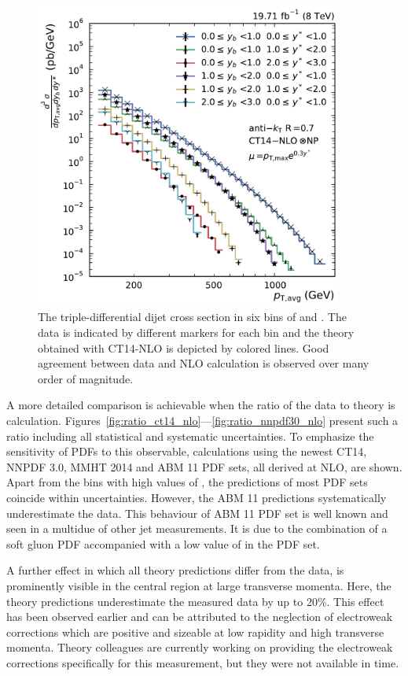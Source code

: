 \begin{figure}[h!tbp]
    \centering
    \includegraphics[width=0.9\textwidth]{figures/measurement/ptavg_spectrum.pdf}\hfill
    \caption[Spectrum of the Triple-differential Dijet Cross Section]{The
    triple-differential dijet cross section in six bins of \ystar and \yboost. The
    data is indicated by different markers for each bin and the theory obtained
    with CT14-NLO is depicted by colored lines. Good agreement between data and
    NLO calculation is observed over many order of magnitude.}
    \label{fig:measurement_result}
\end{figure}

A more detailed comparison is achievable when the ratio of the data to theory is
calculation. Figures~\ref{fig:ratio_ct14_nlo}---\ref{fig:ratio_nnpdf30_nlo}
present such a ratio including all statistical and systematic uncertainties. To
emphasize the sensitivity of PDFs to this observable, calculations using the
newest CT14, NNPDF 3.0, MMHT 2014 and ABM 11 PDF sets, all derived at NLO, are
shown. Apart from the bins with high values of \yboost, the predictions of most
PDF sets coincide within uncertainties. However, the ABM 11 predictions
systematically underestimate the data. This behaviour of ABM 11 PDF set is well
known and seen in a multidue of other jet measurements. It is due to the
combination of a soft gluon PDF accompanied with a low value of \asmz in the PDF
set.

A further effect in which all theory predictions differ from the data, is
prominently visible in the central region at large transverse momenta. Here, the
theory predictions underestimate the measured data by up to 20\%. This effect
has been observed earlier and can be attributed to the neglection of
electroweak corrections which are positive and sizeable at low rapidity and high
transverse momenta.  Theory colleagues are currently working on providing the
electroweak corrections specifically for this measurement, but they were not
available in time.


